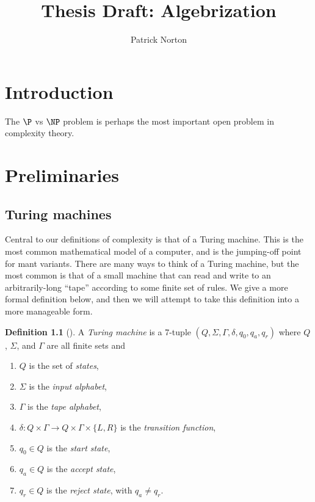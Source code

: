 \documentclass[english]{reedthesis}
\title{Thesis Draft: Algebrization}
\author{Patrick Norton}
\theoremstyle{plain}
\theoremstyle{definition}
\newtheorem{defn}[defn]{Definition}
\theoremstyle{remark}
\begin{document}
\maketitle

\tableofcontents


\chapter*{Introduction}

The $\P$ vs $\NP$ problem is perhaps the most important open problem in
complexity theory.

\chapter{Preliminaries}


\section{Turing machines}


Central to our definitions of complexity is that of a Turing machine. This is
the most common mathematical model of a computer, and is the jumping-off point
for mant variants. There are many ways to think of a Turing machine, but the
most common is that of a small machine that can read and write to an
arbitrarily-long ``tape'' according to some finite set of rules. We give a more
formal definition below, and then we will attempt to take this definition into a
more manageable form.
\begin{defn}[{\cite[Def.\ 3.1]{Sip97}}]\label{def:TM}
  A \emph{Turing machine} is a 7-tuple $(Q, \Sigma, \Gamma, \delta, q_{0}, q_{a}, q_{r})$ where
  $Q$, $\Sigma$, and $\Gamma$ are all finite sets and
  \begin{enumerate}
    \item $Q$ is the set of \emph{states},
    \item $\Sigma$ is the \emph{input alphabet},
    \item $\Gamma$ is the \emph{tape alphabet},
    \item $\delta: Q \times \Gamma \rightarrow Q \times \Gamma \times \{L, R\}$ is the \emph{transition function},
    \item $q_{0} \in Q$ is the \emph{start state},
    \item $q_{a} \in Q$ is the \emph{accept state},
    \item $q_{r} \in Q$ is the \emph{reject state}, with $q_{a} \ne q_{r}$.
  \end{enumerate}
\end{defn}
\end{document}
